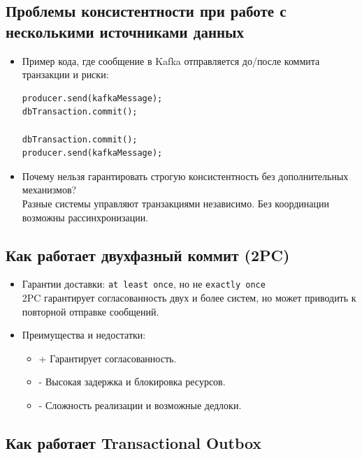 \documentclass[a4paper,14pt]{article}
\begin{document}
\subsection{Проблемы консистентности при работе с несколькими источниками данных}

\begin{itemize}
\item Пример кода, где сообщение в Kafka отправляется до/после коммита транзакции и риски:
\begin{lstlisting}[style=javastyle]
producer.send(kafkaMessage);
dbTransaction.commit();

dbTransaction.commit();
producer.send(kafkaMessage);
\end{lstlisting}

\item Почему нельзя гарантировать строгую консистентность без дополнительных механизмов? \\
Разные системы управляют транзакциями независимо. Без координации возможны рассинхронизации.
\end{itemize}

\subsection{Как работает двухфазный коммит (2PC)}

\begin{itemize}
\item Гарантии доставки: \texttt{at least once}, но не \texttt{exactly once} \\
2PC гарантирует согласованность двух и более систем, но может приводить к повторной отправке сообщений.

\item Преимущества и недостатки: \\
\begin{itemize}
  \item + Гарантирует согласованность.
  \item - Высокая задержка и блокировка ресурсов.
  \item - Сложность реализации и возможные дедлоки.
\end{itemize}
\end{itemize}

\subsection{Как работает Transactional Outbox}
\end{document}
